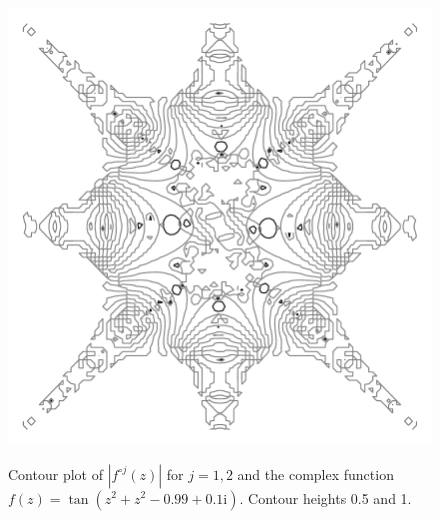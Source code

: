 \documentclass[12pt, a4paper]{amsart}
\newcommand{\mi}{\text{i}}  %
\begin{document}
\pagebreak
\begin{figure}[!ht]
\includegraphics[width=160mm]{images/mite.pdf}\\[10mm]
\caption{
Contour plot of $|f^{\circ j}(z)|$ for $j = 1, 2$ and the complex function $f(z) = \tan(z^2  + z^2 - 0.99 + 0.1\mi)$.
Contour heights 0.5 and 1.
}
\end{figure}
\pagebreak
\end{document}
